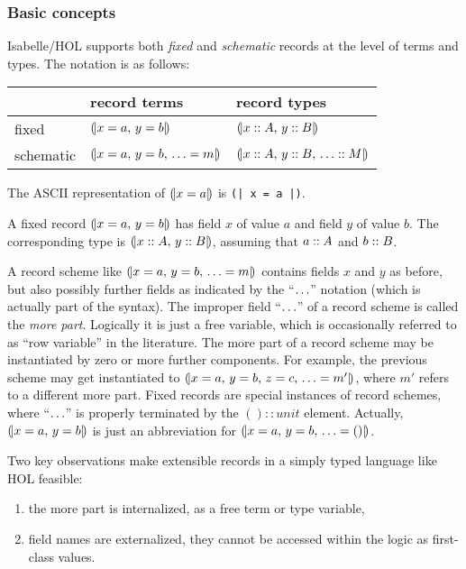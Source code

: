\subsubsection{Basic concepts}

Isabelle/HOL supports both \emph{fixed} and \emph{schematic} records at the
level of terms and types.  The notation is as follows:

\begin{center}
\begin{tabular}{l|l|l}
  & record terms & record types \\ \hline
  fixed & $\mathopen{(\!|} x = a\mathpunct{,\,} y = b \mathclose{|\!)}$ & $\mathopen{(\!|} x \mathrel{::} A\mathpunct{,\,} y \mathrel{::} B \mathclose{|\!)}$ \\
  schematic & $\mathopen{(\!|} x = a\mathpunct{,\,} y = b\mathpunct{,\,} \ldots = m \mathclose{|\!)}$ &
    $\mathopen{(\!|} x \mathrel{::} A\mathpunct{,\,} y \mathrel{::} B\mathpunct{,\,} \ldots \mathrel{::} M \mathclose{|\!)}$ \\
\end{tabular}
\end{center}

\noindent The ASCII representation of $\mathopen{(\!|} x = a \mathclose{|\!)}$ is \texttt{(| x = a |)}.

A fixed record $\mathopen{(\!|} x = a\mathpunct{,\,} y = b \mathclose{|\!)}$ has field $x$ of value $a$ and field
$y$ of value $b$.  The corresponding type is $\mathopen{(\!|} x \mathrel{::} A\mathpunct{,\,} y \mathrel{::} B \mathclose{|\!)}$,
assuming that $a \mathrel{::} A$ and $b \mathrel{::} B$.

A record scheme like $\mathopen{(\!|} x = a\mathpunct{,\,} y = b\mathpunct{,\,} \ldots = m \mathclose{|\!)}$ contains fields
$x$ and $y$ as before, but also possibly further fields as indicated by the
``$\ldots$'' notation (which is actually part of the syntax).  The improper
field ``$\ldots$'' of a record scheme is called the \emph{more part}.
Logically it is just a free variable, which is occasionally referred to as
``row variable'' in the literature.  The more part of a record scheme may be
instantiated by zero or more further components.  For example, the previous
scheme may get instantiated to $\mathopen{(\!|} x = a\mathpunct{,\,} y = b\mathpunct{,\,} z = c\mathpunct{,\,} \ldots =
  m' \mathclose{|\!)}$, where $m'$ refers to a different more part.  Fixed records are special
instances of record schemes, where ``$\ldots$'' is properly terminated by the
$() :: unit$ element.  Actually, $\mathopen{(\!|} x = a\mathpunct{,\,} y = b \mathclose{|\!)}$ is just an
abbreviation for $\mathopen{(\!|} x = a\mathpunct{,\,} y = b\mathpunct{,\,} \ldots = () \mathclose{|\!)}$.

\medskip

Two key observations make extensible records in a simply typed language like
HOL feasible:
\begin{enumerate}
\item the more part is internalized, as a free term or type variable,
\item field names are externalized, they cannot be accessed within the logic
  as first-class values.
\end{enumerate}

